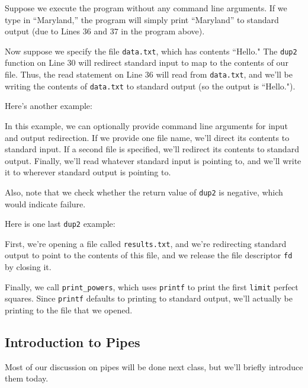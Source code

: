 Suppose we execute the program without any command line arguments. If we type in ``Maryland,'' the program will simply print ``Maryland'' to standard output (due to Lines $36$ and $37$ in the program above). 

Now suppose we specify the file \verb!data.txt!, which has contents ``Hello." The \verb!dup2! function on Line $30$ will redirect standard input to map to the contents of our file. Thus, the read statement on Line $36$ will read from \verb!data.txt!, and we'll be writing the contents of \verb!data.txt! to standard output (so the output is ``Hello."). 



Here's another example:

\lstset{caption=Dup2 Example 1}
\begin{center}

\end{center}

In this example, we can optionally provide command line arguments for input and output redirection. If we provide one file name, we'll direct its contents to standard input. If a second file is specified, we'll redirect its contents to standard output. Finally, we'll read whatever standard input is pointing to, and we'll write it to wherever standard output is pointing to.

Also, note that we check whether the return value of \verb!dup2! is negative, which would indicate failure. 


 Here is one last \verb!dup2! example:
 
 \lstset{caption=Dup2 Example 3}
\begin{center}

\end{center}

First, we're opening a file called \verb!results.txt!, and we're redirecting standard output to point to the contents of this file, and we release the file descriptor \verb!fd! by closing it. 

Finally, we call \verb!print_powers!, which uses \verb!printf! to print the first \verb!limit! perfect squares. Since \verb!printf! defaults to printing to standard output, we'll actually be printing to the file that we opened.


\subsection{Introduction to Pipes}
Most of our discussion on pipes will be done next class, but we'll briefly introduce them today.

